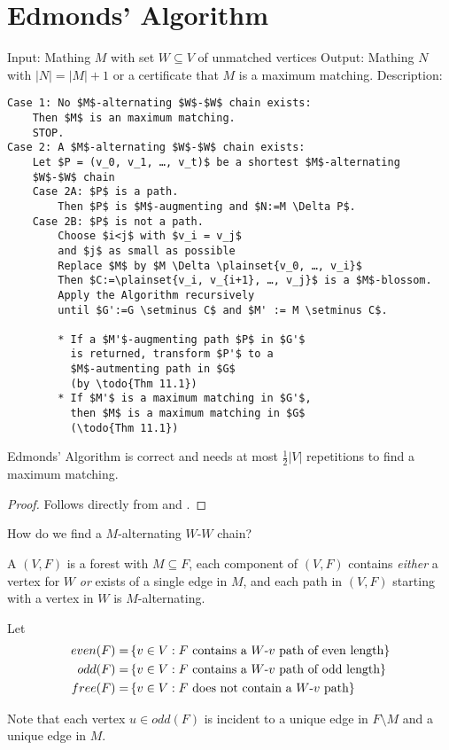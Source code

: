 \section*{Edmonds' Algorithm}
Input: Mathing $M$ with set $W \subseteq V$ of unmatched vertices
Output: Mathing $N$ with $|N| = |M| + 1$ or a certificate that $M$ is a
maximum matching.
Description:
\begin{lstlisting}
Case 1: No $M$-alternating $W$-$W$ chain exists:
	Then $M$ is an maximum matching. 
	STOP.
Case 2: A $M$-alternating $W$-$W$ chain exists:
	Let $P = (v_0, v_1, …, v_t)$ be a shortest $M$-alternating 
	$W$-$W$ chain
	Case 2A: $P$ is a path.
		Then $P$ is $M$-augmenting and $N:=M \Delta P$.
	Case 2B: $P$ is not a path.
		Choose $i<j$ with $v_i = v_j$ 
		and $j$ as small as possible
		Replace $M$ by $M \Delta \plainset{v_0, …, v_i}$
		Then $C:=\plainset{v_i, v_{i+1}, …, v_j}$ is a $M$-blossom.
		Apply the Algorithm recursively 
		until $G':=G \setminus C$ and $M' := M \setminus C$.
		
		* If a $M'$-augmenting path $P$ in $G'$
		  is returned, transform $P'$ to a 
		  $M$-autmenting path in $G$ 
		  (by \todo{Thm 11.1})
		* If $M'$ is a maximum matching in $G'$, 
		  then $M$ is a maximum matching in $G$
		  (\todo{Thm 11.1})
\end{lstlisting}
\begin{thm}
	Edmonds' Algorithm is correct and needs at most $\frac12 |V|$ repetitions to find a maximum matching.
\end{thm}

\begin{proof}
	Follows directly from  and .
\end{proof}

How do we find a $M$-alternating $W$-$W$ chain?
\begin{defn}
	A  $(V,F)$ is a
	forest with $ M \subseteq F$, each component of $(V,F)$ contains 
	\emph{either} a vertex for $W$ \emph{or} exists of a single edge in $M$,
	and each path in $(V,F)$ starting with a vertex in $W$ is 
	$M$-alternating.
	
	Let \begin{align*}
		even(F) =& \left\{ v \in V: F \text{ contains a $W$-$v$ path of even length}\right\} \\
		odd(F) =& \left\{ v \in V: F \text{ contains a $W$-$v$ path of odd length}\right\} \\
		free(F) =& \left\{ v \in V: F \text{ does not contain a $W$-$v$ path}\right\} 
	\end{align*}
	
	
	Note that each vertex $u \in odd(F)$ is incident to a unique edge in
	$F \setminus M$ and a unique edge in $M$.
\end{defn}

